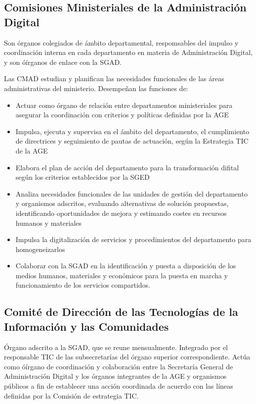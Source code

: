     \subsection{Comisiones Ministeriales de la Administración Digital}
        Son órganos colegiados de ámbito departamental, respomsables del impulso y coordinación interna en cada departamento en materia de Administración Digital, y son óírganos de enlace con la SGAD.

        Las CMAD  estudian y planifican las necesidades funcionales de las áreas administrativas del ministerio. Desempeñan las funciones de:
        \begin{itemize}
            \item Actuar como órgano de relación entre departamentos ministeriales para asegurar la coordinación con criterios y políticas definidas por la AGE
            \item Impulsa, ejecuta y supervisa en el ámbito del departamento, el cumplimiento de directrices y seguimiento de pautas de actuación, según la Estrategia TIC de la AGE
            \item Elabora el plan de acción del departamento para la transformación difital según los criterios establecidos por la SGED
            \item Analiza necesidades funcionales de las unidades de gestión del departamento y organismos adscritos, evaluando alternativas de solución propuestas, identificando oportunidades de mejora y estimando costes en recursos humanos y materiales
            \item Impulsa la digitalización de servicios y procedimientos del departamento para homogeneizarlos
            \item Colaborar con la SGAD en la identificación y puesta a disposición de los medios humanos, materiales y económicos para la puesta en marcha y funcionamiento de los servicios compartidos.
        \end{itemize}
    \subsection{Comité de Dirección de las Tecnologías de la Información y las Comunidades}
        Órgano adscrito a la SGAD, que se reune mensualmente. Integrado por el responsable TIC de las subsecretarías del órgano superior correspondiente. Actúa como óírgano de coordinación y colaboración entre la Secretaría General de Administración Digital y los órganos integrantes de la AGE y organismos públicos a fin de establecer una acción coordinada de acuerdo con las líneas definidas por la Comisión de estrategia TIC.

